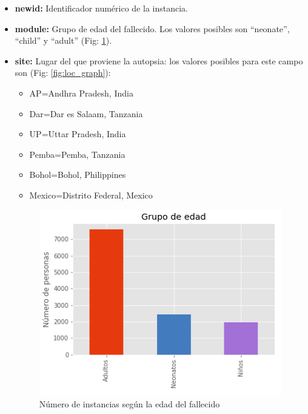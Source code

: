 \documentclass[10pt,a4paper]{article}
\begin{document}
	\begin{itemize}
		\item \textbf{newid:} Identificador numérico de la instancia.
		\item \textbf{module:} Grupo de edad del fallecido. Los valores posibles son ``neonate'', ``child'' y ``adult'' (Fig: \ref{fig:age_graph}).
		\item \textbf{site:} Lugar del que proviene la autopsia: los valores posibles para este campo son (Fig: \ref{fig:loc_graph}):
	    \begin{itemize}
		    \item AP=Andhra Pradesh, India
		    \item Dar=Dar es Salaam, Tanzania
		    \item UP=Uttar Pradesh, India
		    \item Pemba=Pemba, Tanzania
		    \item Bohol=Bohol, Philippines
		    \item Mexico=Distrito Federal, Mexico
	    \end{itemize}

		\begin{figure}
			\includegraphics[width=\linewidth]{figures/plot_grupo_edad.png}
			\caption{Número de instancias según la edad del fallecido}
			\label{fig:age_graph}
		\end{figure}


\end{itemize}
\end{document}
